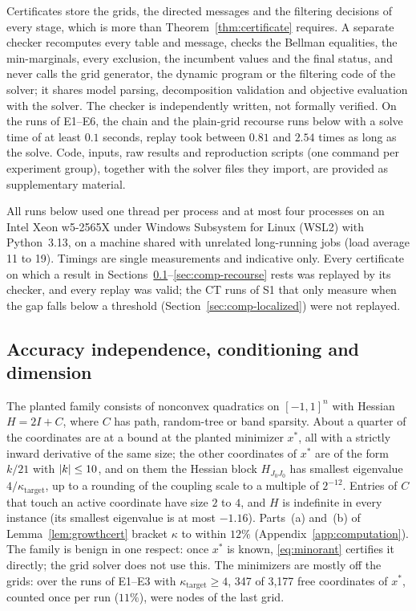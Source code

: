 Certificates store the grids, the directed messages and the filtering
decisions of every stage, which is more than Theorem~\ref{thm:certificate}
requires. A separate checker recomputes every table and message, checks the
Bellman equalities, the min-marginals, every exclusion, the incumbent values
and the final status, and never calls the grid generator, the dynamic program
or the filtering code of the solver; it shares model parsing, decomposition
validation and objective evaluation with the solver. The checker is
independently written, not formally verified. On the runs of E1--E6, the
chain and the plain-grid recourse runs below with a solve time of at least
$0.1$ seconds, replay took between $0.81$ and $2.54$ times as long as the
solve. Code, inputs, raw results and reproduction scripts (one command per
experiment group), together with the solver files they import, are provided
as supplementary material.

All runs below used one thread per process and at most four processes on an
Intel Xeon w5-2565X under Windows Subsystem for Linux (WSL2) with
Python~3.13, on a machine shared with unrelated long-running jobs (load
average 11 to 19). Timings are single measurements and indicative only. Every
certificate on which a result in
Sections~\ref{sec:comp-growth}--\ref{sec:comp-recourse} rests was replayed by
its checker, and every replay was valid; the CT runs of S1 that only measure
when the gap falls below a threshold (Section~\ref{sec:comp-localized}) were
not replayed.

\subsection{Accuracy independence, conditioning and dimension}
\label{sec:comp-growth}
The planted family consists of nonconvex quadratics on $[-1,1]^n$ with Hessian
$H=2I+C$, where $C$ has path, random-tree or band sparsity. About a quarter of
the coordinates are at a bound at the planted minimizer $x^*$, all with a
strictly inward derivative of the same size; the other coordinates of $x^*$
are of the form $k/21$ with $\lvert k\rvert\le10$, and on them the Hessian block
$H_{J_0J_0}$ has smallest eigenvalue $4/\kappa_{\mathrm{target}}$, up to a
rounding of the coupling scale to a multiple of $2^{-12}$. Entries of $C$ that
touch an active coordinate have size $2$ to $4$, and $H$ is indefinite in
every instance (its smallest eigenvalue is at most $-1.16$).
Parts~(a) and~(b) of Lemma~\ref{lem:growthcert} bracket $\kappa$ to within
$12\%$ (Appendix~\ref{app:computation}). The family is benign in
one respect: once $x^*$ is known, \eqref{eq:minorant} certifies it directly;
the grid solver does not use this. The minimizers are mostly off the grids:
over the runs of E1--E3 with $\kappa_{\mathrm{target}}\ge4$, 347 of 3{,}177
free coordinates of $x^*$, counted once per run ($11\%$), were nodes of the
last grid.

